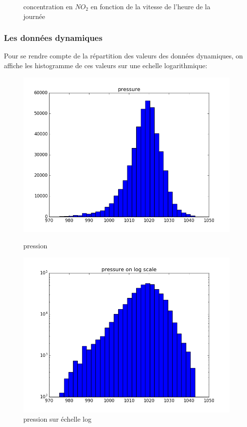 \begin{figure}[H]
  \caption{concentration en $NO_2$ en fonction de la vitesse de l'heure de la journée}
	\endminipage\hfill
\end{figure}
\subsubsection{Les données dynamiques}

Pour se rendre compte de la répartition des valeurs des données dynamiques, on affiche les histogramme de ces valeurs sur une echelle logarithmique:

\begin{figure}[H]
	\captionsetup{labelformat=empty}
	\includegraphics[width=\linewidth]{images/pression.png}
	\caption{pression}
	\endminipage\hfill
	\includegraphics[width=\linewidth]{images/log_pression.png}
	\caption{pression sur échelle log}
	\endminipage\hfill
\end{figure}

